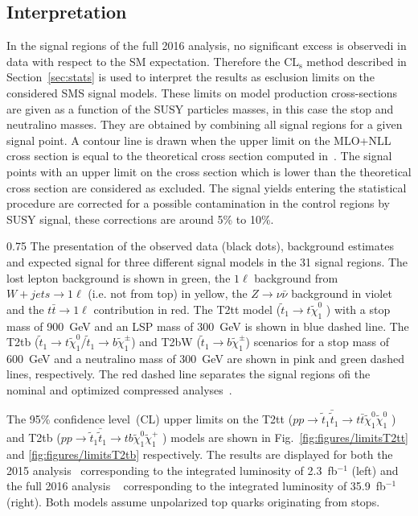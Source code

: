 \subsection{Interpretation}

In the signal regions of the full 2016 analysis, no significant excess is observedi in data with respect to the SM expectation.  Therefore the $\mathrm{CL_{s}}$ method described in Section~\ref{sec:stats} is used to interpret the results as esclusion limits on the considered SMS signal models. These limits on model production cross-sections are given as a function of the SUSY particles masses, in this case the stop and neutralino masses. They are obtained by combining all signal regions for a given signal point. A contour line is drawn when the upper limit on the MLO+NLL cross section is equal to the theoretical cross section computed in~\cite{Borschensky:2014cia}. The signal points with an upper limit on the cross section which is lower than the theoretical cross section are considered as excluded. The signal yields entering the statistical procedure are corrected for a possible contamination in the control regions by SUSY signal, these corrections are around 5\% to 10\%.



                 {0.75}       %
                 { The presentation of the observed data (black dots), background estimates and expected signal for three different signal models in the 31 signal regions. The lost lepton background is shown in green, the $1 \ell$ background from $W+jets \to 1\ell$ (i.e. not from top) in yellow, the $Z \to \nu \bar{\nu}$ background in violet and the $t\bar{t} \to 1\ell$ contribution in red. The T2tt model ($\tilde{t}_{1} \to t \tilde{\chi}^{0}_{1}$ ) with a stop mass of 900~GeV and an LSP mass of 300~GeV is shown in blue dashed line. The T2tb ($\tilde{t}_{1} \to t \tilde{\chi}^{0}_{1} /\tilde{t}_{1} \to b \tilde{\chi}^{\pm}_{1}$) and T2bW ($\tilde{t}_{1} \to b \tilde{\chi}^{\pm}_{1}$) scenarios for a stop mass of 600~GeV and a neutralino mass of 300~GeV are shown in pink and green dashed lines, respectively. The red dashed line separates the signal regions ofi the nominal and optimized compressed analyses~\cite{Sirunyan:2017xse}. }

The 95\% confidence level~(CL) upper limits  on the  T2tt ($ pp \to \tilde{t}_{1} \bar{\tilde{t}}_{1} \to t \bar{t} \tilde{\chi}^{0}_{1} \tilde{\chi}^{0}_{1}$ )  and T2tb ($ pp \to \tilde{t}_{1} \bar{\tilde{t}}_{1} \to t b \tilde{\chi}^{0}_{1} \tilde{\chi}^{+}_{1}$ ) models are shown in Fig.~\ref{fig:figures/limitsT2tt} and \ref{fig:figures/limitsT2tb} respectively. The  results are displayed for both the 2015 analysis~\cite{Sirunyan:2016jpr} corresponding to the integrated luminosity of 2.3~fb$^{-1}$  (left) and the full 2016 analysis ~\cite{Sirunyan:2017xse} corresponding to the integrated luminosity of 35.9~fb$^{-1}$  (right). Both models assume unpolarized top quarks originating from stops.  

